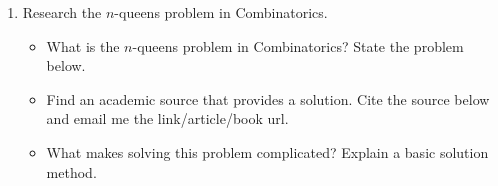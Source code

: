 \documentclass[english]{article}
\begin{document}
\begin{enumerate}
\item Research the $n$-queens problem in Combinatorics.
\begin{itemize}
\item What is the $n$-queens problem in Combinatorics?  State the problem below.
\vfill

\item Find an academic source that provides a solution.  Cite the source below and email me the link/article/book url.
\vfill

\item What makes solving this problem complicated?  Explain a basic solution method.

\vfill
\vfill

\end{itemize}





\end{enumerate}
\end{document}
